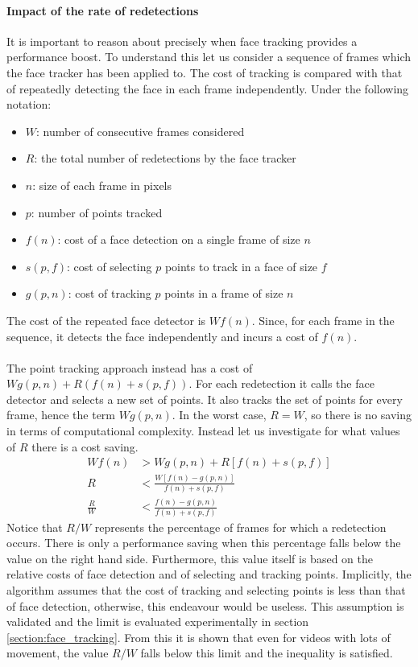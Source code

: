 \paragraph{Impact of the rate of redetections}
It is important to reason about precisely when face tracking provides a performance boost. To understand this let us consider a sequence of frames which the face tracker has been applied to. The cost of tracking is compared with that of repeatedly detecting the face in each frame independently. Under the following notation:
\begin{itemize}
   \item $W$: number of consecutive frames considered 
   \item $R$: the total number of redetections by the face tracker
   \item $n$: size of each frame in pixels
   \item $p$: number of points tracked
   \item $f(n)$: cost of a face detection on a single frame of size $n$
   \item $s(p,f)$: cost of selecting $p$ points to track in a face of size $f$
   \item $g(p,n)$: cost of tracking $p$ points in a frame of size $n$
\end{itemize}
The cost of the repeated face detector is $Wf(n)$. Since, for each frame in the sequence, it detects the face independently and incurs a cost of $f(n)$.  
\\ \\
The point tracking approach instead has a cost of $Wg(p,n) + R(f(n) + s(p,f))$. For each redetection it calls the face detector and selects a new set of points. It also tracks the set of points for every frame, hence the term $Wg(p,n)$. In the worst case, $R=W$, so there is no saving in terms of computational complexity. Instead let us investigate for what values of $R$ there is a cost saving.
\begin{align*}
    Wf(n) &> Wg(p,n) + R[f(n) + s(p,f)] \\
    R &< \frac{W[f(n) - g(p,n)]}{f(n) + s(p,f)}\\
    \frac{R}{W} &< \frac{f(n)-g(p,n)}{f(n)+s(p,f)}
\end{align*}
Notice that $R/W$ represents the percentage of frames for which a redetection occurs. There is only a performance saving when this percentage falls below the value on the right hand side. Furthermore, this value itself is based on the relative costs of face detection and of selecting and tracking points. Implicitly, the algorithm assumes that the cost of tracking and selecting points is less than that of face detection, otherwise, this endeavour would be useless. This assumption is validated and the limit is evaluated experimentally in section \ref{section:face_tracking}. From this it is shown that even for videos with lots of movement, the value $R/W$ falls below this limit and the inequality is satisfied. 
